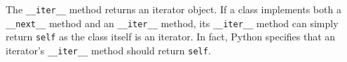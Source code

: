 The \lstinline$__iter__$ method returns an iterator object. If a class
implements both a \lstinline$__next__$ method and an \lstinline$__iter__$
method, its \lstinline$__iter__$ method can simply return \lstinline$self$ as
the class itself is an iterator. In fact, Python specifies that an iterator's
\lstinline$__iter__$ method should return \lstinline$self$.
